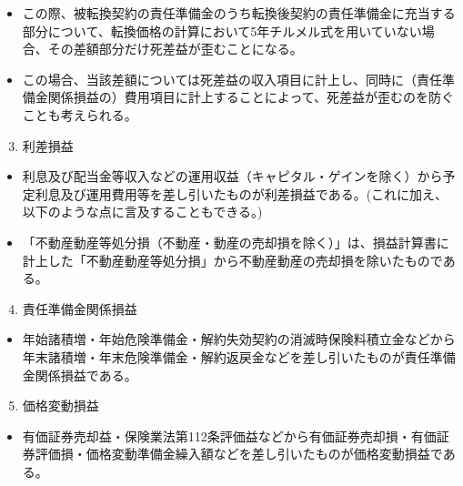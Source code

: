\documentclass[report,gutter=10mm,fore-edge=10mm,uplatex,dvipdfmx]{jlreq}
\begin{document}
\begin{itemize}
  \begin{itemize}
  \tightlist
  \item
    この際、被転換契約の責任準備金のうち転換後契約の責任準備金に充当する部分について、転換価格の計算において5年チルメル式を用いていない場合、その差額部分だけ死差益が歪むことになる。
  \item
    この場合、当該差額については死差益の収入項目に計上し、同時に（責任準備金関係損益の）費用項目に計上することによって、死差益が歪むのを防ぐことも考えられる。
  \end{itemize}
\end{itemize}

\begin{enumerate}
\setcounter{enumi}{2}
\tightlist
\item
  利差損益
\end{enumerate}

\begin{itemize}
\tightlist
\item
  利息及び配当金等収入などの運用収益（キャピタル・ゲインを除く）から予定利息及び運用費用等を差し引いたものが利差損益である。(これに加え、以下のような点に言及することもできる。)
\item
  「不動産動産等処分損（不動産・動産の売却損を除く）」は、損益計算書に計上した「不動産動産等処分損」から不動産動産の売却損を除いたものである。
\end{itemize}

\begin{enumerate}
\setcounter{enumi}{3}
\tightlist
\item
  責任準備金関係損益
\end{enumerate}

\begin{itemize}
\tightlist
\item
  年始諸積増・年始危険準備金・解約失効契約の消滅時保険料積立金などから年末諸積増・年末危険準備金・解約返戻金などを差し引いたものが責任準備金関係損益である。
\end{itemize}

\begin{enumerate}
\setcounter{enumi}{4}
\tightlist
\item
  価格変動損益
\end{enumerate}

\begin{itemize}
\tightlist
\item
  有価証券売却益・保険業法第112条評価益などから有価証券売却損・有価証券評価損・価格変動準備金繰入額などを差し引いたものが価格変動損益である。
\end{itemize}
\end{document}
